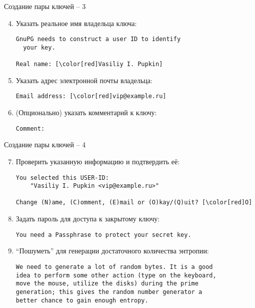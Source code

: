 \documentclass[presentation]{beamer}
\begin{document}
\begin{frame}[fragile]{Создание пары ключей -- 3}
  \begin{enumerate}
    \setcounter{enumi}{3}
  \item Указать реальное имя владельца ключа:
\begin{Verbatim}[commandchars=\\\[\]]
GnuPG needs to construct a user ID to identify
  your key.

Real name: [\color[red]Vasiliy I. Pupkin]
\end{Verbatim}
  \item Указать адрес электронной почты владельца:
\begin{Verbatim}[commandchars=\\\[\]]
Email address: [\color[red]vip@example.ru]
\end{Verbatim}

  \item (Опционально) указать комментарий к ключу:
\begin{Verbatim}[commandchars=\\\[\]]
Comment:
\end{Verbatim}
    \end{enumerate}
\end{frame}

\begin{frame}[fragile]{Создание пары ключей -- 4}
  \begin{enumerate}
  \setcounter{enumi}{6}
\item Проверить указанную информацию и подтвердить её:
  \begin{Verbatim}[commandchars=\\\[\]]
You selected this USER-ID:
    "Vasiliy I. Pupkin <vip@example.ru>"

Change (N)ame, (C)omment, (E)mail or (O)kay/(Q)uit? [\color[red]O]
  \end{Verbatim}

\item Задать пароль для доступа к закрытому ключу:
  \begin{Verbatim}[commandchars=\\\[\]]
You need a Passphrase to protect your secret key.
  \end{Verbatim}

\item ``Пошуметь'' для генерации достаточного количества энтропии:
  \begin{Verbatim}[commandchars=\\\[\]]
We need to generate a lot of random bytes. It is a good 
idea to perform some other action (type on the keyboard,
move the mouse, utilize the disks) during the prime
generation; this gives the random number generator a
better chance to gain enough entropy.
  \end{Verbatim}
\end{enumerate}
\end{frame}
\end{document}
